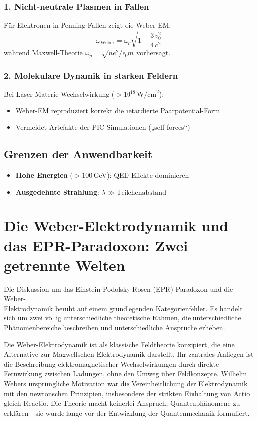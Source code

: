 \subsubsection{1. Nicht-neutrale Plasmen in Fallen}
Für Elektronen in Penning-Fallen zeigt die Weber-EM:
\begin{equation}
\omega_{\text{Weber}} = \omega_p\sqrt{1 - \frac{3}{4}\frac{v_0^2}{c^2}}
\end{equation}
während Maxwell-Theorie $\omega_p = \sqrt{ne^2/\epsilon_0 m}$ vorhersagt.

\subsubsection{2. Molekulare Dynamik in starken Feldern}
Bei Laser-Materie-Wechselwirkung ($>10^{18}\,\text{W/cm}^2$):
\begin{itemize}
\item Weber-EM reproduziert korrekt die retardierte Paarpotential-Form
\item Vermeidet Artefakte der PIC-Simulationen („self-forces“)
\end{itemize}

\subsection{Grenzen der Anwendbarkeit}
\begin{itemize}
\item \textbf{Hohe Energien} ($>100$\,GeV): QED-Effekte dominieren
\item \textbf{Ausgedehnte Strahlung}:  $\lambda \gg \text{Teilchenabstand}$
\end{itemize}

\section{Die Weber-Elektrodynamik und das EPR-Paradoxon: Zwei getrennte Welten}
Die Diskussion um das Einstein-Podolsky-Rosen (EPR)-Paradoxon und die Weber-\\Elektrodynamik beruht auf einem grundlegenden Kategorienfehler. Es handelt sich um zwei völlig
unterschiedliche theoretische Rahmen, die unterschiedliche Phänomenbereiche beschreiben und unterschiedliche Ansprüche erheben.

Die Weber-Elektrodynamik ist als klassische Feldtheorie konzipiert, die eine Alternative zur Maxwellschen Elektrodynamik darstellt. Ihr zentrales Anliegen ist die Beschreibung
elektromagnetischer Wechselwirkungen durch direkte Fernwirkung zwischen Ladungen, ohne den Umweg über Feldkonzepte. Wilhelm Webers ursprüngliche Motivation war die Vereinheitlichung
der Elektrodynamik mit den newtonschen Prinzipien, insbesondere der strikten Einhaltung von Actio gleich Reactio. Die Theorie macht keinerlei Anspruch,
Quantenphänomene zu erklären - sie wurde lange vor der Entwicklung der Quantenmechanik formuliert.

